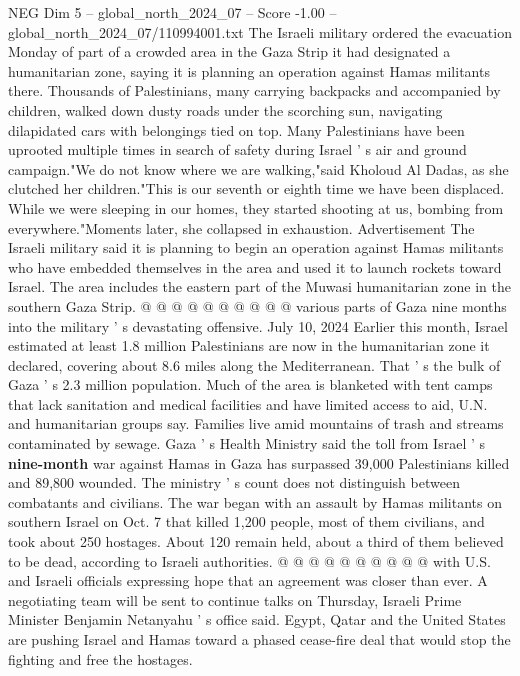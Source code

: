 \begin{textsample}{NEG Dim 5 – global\_north\_2024\_07 – Score -1.00 – global\_north\_2024\_07/110994001.txt}  \label{ex:f5_neg_147}
The Israeli military ordered the evacuation Monday of part of a crowded area in the Gaza Strip it had designated a humanitarian zone, saying it is planning an operation against Hamas militants there.
Thousands of Palestinians, many carrying backpacks and accompanied by children, walked down dusty roads under the scorching sun, navigating dilapidated cars with belongings tied on top.
Many Palestinians have been uprooted multiple times in search of safety during Israel ' s air and ground campaign."We do not know where we are walking,"said Kholoud Al Dadas, as she clutched her children."This is our seventh or eighth time we have been displaced.
While we were sleeping in our homes, they started shooting at us, bombing from everywhere."Moments later, she collapsed in exhaustion.
Advertisement The Israeli military said it is planning to begin an operation against Hamas militants who have embedded themselves in the area and used it to launch rockets toward Israel.
The area includes the eastern part of the Muwasi humanitarian zone in the southern Gaza Strip. @ @ @ @ @ @ @ @ @ @ various parts of Gaza nine months into the military ' s devastating offensive.
July 10, 2024 Earlier this month, Israel estimated at least 1.8 million Palestinians are now in the humanitarian zone it declared, covering about 8.6 miles along the Mediterranean.
That ' s the bulk of Gaza ' s 2.3 million population.
Much of the area is blanketed with tent camps that lack sanitation and medical facilities and have limited access to aid, U.N. and humanitarian groups say.
Families live amid mountains of trash and streams contaminated by sewage.
Gaza ' s Health Ministry said the toll from Israel ' s \textbf{nine-month} war against Hamas in Gaza has surpassed 39,000 Palestinians killed and 89,800 wounded.
The ministry ' s count does not distinguish between combatants and civilians.
The war began with an assault by Hamas militants on southern Israel on Oct. 7 that killed 1,200 people, most of them civilians, and took about 250 hostages.
About 120 remain held, about a third of them believed to be dead, according to Israeli authorities. @ @ @ @ @ @ @ @ @ @ with U.S. and Israeli officials expressing hope that an agreement was closer than ever.
A negotiating team will be sent to continue talks on Thursday, Israeli Prime Minister Benjamin Netanyahu ' s office said.
Egypt, Qatar and the United States are pushing Israel and Hamas toward a phased cease-fire deal that would stop the fighting and free the hostages.

\end{textsample}
